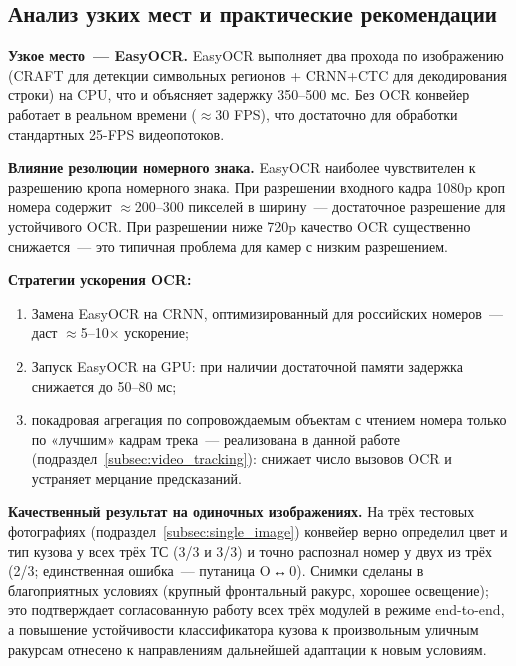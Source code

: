 \documentclass[10pt,a4paper]{report}
\numberwithin{equation}{chapter}
\numberwithin{figure}{chapter}
\numberwithin{table}{chapter}
\begin{document}
\subsection{Анализ узких мест и практические рекомендации}

\textbf{Узкое место~--- EasyOCR.}
EasyOCR выполняет два прохода по изображению (CRAFT для
детекции символьных регионов + CRNN+CTC для декодирования строки)
на CPU, что и объясняет задержку 350--500 мс. Без OCR конвейер
работает в реальном времени ($\approx$30 FPS), что достаточно
для обработки стандартных 25-FPS видеопотоков.

\textbf{Влияние резолюции номерного знака.}
EasyOCR наиболее чувствителен к разрешению кропа номерного знака.
При разрешении входного кадра 1080p кроп номера содержит $\approx$200--300
пикселей в ширину~--- достаточное разрешение для устойчивого OCR. При разрешении
ниже 720p качество OCR существенно снижается~--- это типичная проблема
для камер с низким разрешением.

\textbf{Стратегии ускорения OCR:}
\begin{enumerate}[nosep]
  \item Замена EasyOCR на CRNN, оптимизированный для российских
    номеров~--- даст $\approx$5--10$\times$ ускорение;
  \item Запуск EasyOCR на GPU: при наличии достаточной памяти
    задержка снижается до 50--80 мс;
  \item покадровая агрегация по сопровождаемым объектам с чтением номера
    только по «лучшим» кадрам трека~--- реализована в данной работе
    (подраздел~\ref{subsec:video_tracking}): снижает число вызовов OCR и
    устраняет мерцание предсказаний.
\end{enumerate}

\textbf{Качественный результат на одиночных изображениях.}
На трёх тестовых фотографиях (подраздел~\ref{subsec:single_image})
конвейер верно определил цвет и тип кузова у всех трёх ТС (3/3 и 3/3)
и точно распознал номер у двух из трёх (2/3; единственная ошибка~---
путаница O\,↔\,0). Снимки сделаны в благоприятных условиях (крупный
фронтальный ракурс, хорошее освещение); это подтверждает согласованную
работу всех трёх модулей в режиме end-to-end, а повышение устойчивости
классификатора кузова к произвольным уличным ракурсам отнесено к
направлениям дальнейшей адаптации к новым условиям.

\end{document}
